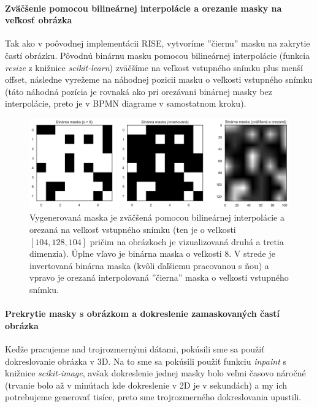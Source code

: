 \paragraph{Zväčšenie pomocou bilineárnej interpolácie a orezanie masky na veľkosť obrázka}

Tak ako v poôvodnej implementácii RISE, vytvoríme ''čiernu'' masku na zakrytie častí obrázku. Pôvodnú binárnu masku pomocou bilineárnej interpolácie (funkcia \textit{resize} z knižnice \textit{scikit-learn}) zväčšíme na veľkost vstupného snímku plus menší offset, následne vyrežeme na náhodnej pozicii masku o veľkosti vstupného snímku (táto náhodná pozícia je rovnaká ako pri orezávani binárnej masky bez interpolácie, preto je v BPMN diagrame v samostatnom kroku).

\begin{figure}[h!]
    \centering
    \includegraphics[width=13cm]{assets/images/interpolated_mask.png}
    \caption{Vygenerovaná maska je zväčšená pomocou bilineárnej interpolácie a orezaná na veľkosť vstupného snímku (ten je o veľkosti $[104, 128, 104]$ pričim na obrázkoch je vizualizovaná druhá a tretia dimenzia). Úplne vľavo je binárna maska o veľkosti $8$. V strede je invertovaná binárna maska (kvôli ďaľšiemu pracovanou s ňou) a vpravo je orezaná interpolovaná ''čierna'' maska o veľkosti vstupného snímku.}
    \label{fig:interpolated_mask}
\end{figure}

\paragraph{Prekrytie masky s obrázkom a dokreslenie zamaskovaných častí obrázka}

Keďže pracujeme nad trojrozmernými dátami, pokúsili sme sa použiť dokreslovanie obrázka v 3D. Na to sme sa pokúsili použiť funkciu \textit{inpaint} s knižnice \textit{scikit-image}, avšak dokreslenie jednej masky bolo veľmi časovo náročné (trvanie bolo až v minútach kde dokreslenie v 2D je v sekundách) a my ich potrebujeme generovať tisíce, preto sme trojrozmerného dokreslovania upustili.


